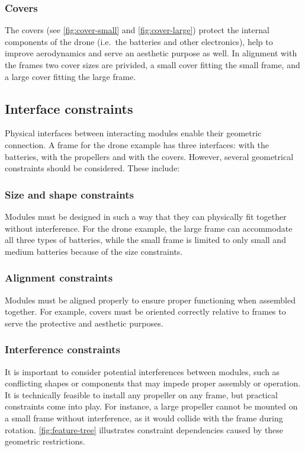 \documentclass[sigconf,review]{acmart}
\begin{document}
\subsubsection*{Covers}
\label{sec:covers}

The covers (see \cref{fig:cover-small} and \cref{fig:cover-large}) protect the internal components of the drone (i.e.~the batteries and other electronics), help to improve aerodynamics and serve an aesthetic purpose as well.
In alignment with the frames two cover sizes are privided, a small cover fitting the small frame, and a large cover fitting the large frame.

\subsection{Interface constraints}
\label{sec:contraints}

Physical interfaces between interacting modules enable their geometric connection. 
A frame for the drone example has three interfaces: with the batteries, with the propellers and with the covers. 
However, several geometrical constraints should be considered. These include:

\subsubsection*{Size and shape constraints}

Modules must be designed in such a way that they can physically fit together without interference. 
For the drone example, the large frame can accommodate all three types of batteries, while the small frame is limited to only small and medium batteries because of the size constraints.

\subsubsection*{Alignment constraints}

Modules must be aligned properly to ensure proper functioning when assembled together. 
For example, covers must be oriented correctly relative to frames to serve the protective and aesthetic purposes. 

\subsubsection*{Interference constraints}

It is important to consider potential interferences between modules, such as conflicting shapes or components that may impede proper assembly or operation. 
It is technically feasible to install any propeller on any frame, but practical constraints come into play. 
For instance, a large propeller cannot be mounted on a small frame without interference, as it would collide with the frame during rotation.
\cref{fig:feature-tree} illustrates constraint dependencies caused by these geometric restrictions.
\end{document}
